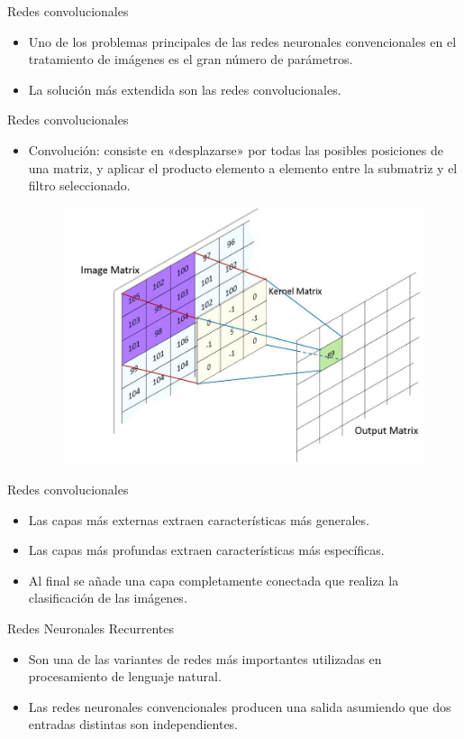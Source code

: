 \documentclass[spanish]{beamer}
\begin{document}
\begin{frame}{Redes convolucionales}
    \begin{itemize}
        \item Uno de los problemas principales de las redes neuronales convencionales en el tratamiento de imágenes es el gran número de parámetros.
        \item La solución más extendida son las redes convolucionales.
    \end{itemize}
\end{frame}

\begin{frame}{Redes convolucionales}
  \begin{itemize}
    \item Convolución: consiste en «desplazarse» por todas las posibles posiciones de una matriz, y aplicar el producto elemento a elemento entre la submatriz y el filtro seleccionado.

    \begin{figure}[h]
      \centering
      \includegraphics[width=.6\textwidth]{img/conv}
    \end{figure}
  \end{itemize}
\end{frame}

\begin{frame}{Redes convolucionales}
    \begin{itemize}
        \item Las capas más externas extraen características más generales.
        \item Las capas más profundas extraen características más específicas.
        \item Al final se añade una capa completamente conectada que realiza la clasificación de las imágenes.
    \end{itemize}
\end{frame}

\begin{frame}{Redes Neuronales Recurrentes}
\begin{itemize}
\item Son una de las variantes de redes más importantes utilizadas en procesamiento
de lenguaje natural.
\item Las redes neuronales convencionales producen una salida asumiendo que dos entradas distintas son independientes.
\end{itemize}
\end{frame}
\end{document}
